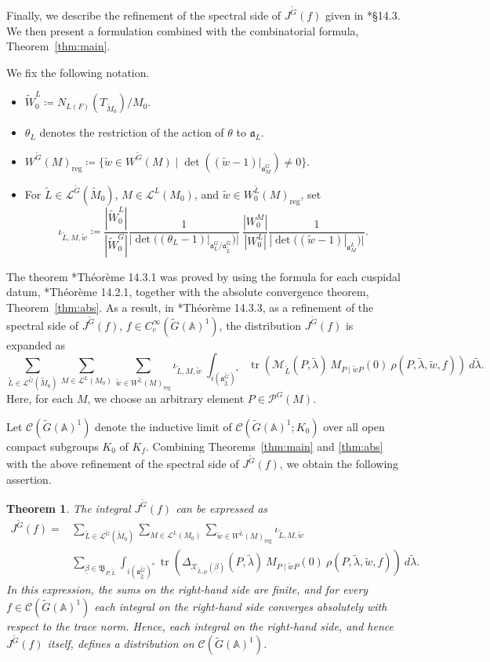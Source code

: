 \documentclass[12pt]{amsart}
\theoremstyle{definition}
\theoremstyle{plain}
\newtheorem{theorem}[definition]{Theorem}
\theoremstyle{remark}
\def\A{\mathbb{A}}%
\def\inf{\infty}
\DeclareMathOperator{\tr}{tr}%
\newcommand{\fa}{\mathfrak{a}}
\newcommand{\fB}{\mathfrak{B}}
\newcommand{\cC}{\mathcal{C}}
\newcommand{\cL}{\mathcal{L}}
\newcommand{\cM}{\mathcal{M}}
\newcommand{\cP}{\mathcal{P}}
\newcommand{\cX}{\mathcal{X}}
\newcommand{\reg}{\mathrm{reg}}
\numberwithin{equation}{section}
\newcommand{\tG}{\widetilde{G}}
\newcommand{\tM}{\widetilde{M}}
\newcommand{\tL}{\widetilde{L}}
\newcommand{\tW}{\widetilde{W}}
\newcommand{\tlambda}{\widetilde{\lambda}}
\newcommand{\tw}{\widetilde{w}}
\begin{document}
Finally, we describe the refinement of the spectral side of $J^{\tG}(f)$ given in \cite{LW13}*{\S14.3}.
We then present a formulation combined with the combinatorial formula, Theorem~\ref{thm:main}.

We fix the following notation.
\begin{itemize}
    \item $\tW^L_0\coloneqq N_{L(F)}(T_{\tM_0})/M_0$. 
    \item $\theta_L$ denotes the restriction of the action of $\theta$ to $\fa_L$.
    \item $W^{\tG}(M)_\reg\coloneqq\{ \tw\in W^{\tG}(M) \mid \det( (\tw-1)|_{\fa_M^G})\neq 0  \}$.
    \item For $\tL\in\cL^{\tG}(\tM_0)$, $M\in\cL^L(M_0)$, and $\tw\in W_0^{\tL}(M)_\reg$, set
    \[
    \iota_{\tL,M,\tw}\coloneqq \frac{|\tW^L_0|}{|\tW^G_0|}\frac{1}{|\det((\theta_L-1)|_{\fa_L^G/\fa_{\tL}^{\tG}})|} \   \frac{|W^M_0|}{|W^L_0|}\frac{1}{|\det((\tw-1)|_{\fa_M^L})|}.
    \]
\end{itemize}
The theorem \cite{LW13}*{Th\'eor\`eme 14.3.1} was proved by using the formula for each cuspidal datum, \cite{LW13}*{Th\'eor\`eme 14.2.1}, together with the absolute convergence theorem, Theorem~\ref{thm:abs}.
As a result, in \cite{LW13}*{Th\'eor\`eme 14.3.3}, as a refinement of the spectral side of $J^{\tG}(f)$, $f\in C_c^\inf(\tG(\A)^1)$, the distribution $J^{\tG} (f)$ is expanded as
\[
\sum_{\tL\in\cL^{\tG}(\tM_0)} \sum_{M\in\cL^L(M_0)} \sum_{\tw\in W^{\tL}(M)_\reg}\iota_{\tL,M,\tw} \ \int_{i(\fa_{\tL}^{\tG})^*} \tr\left( \cM_{\tL}(P,\tlambda) \ M_{P\mid\tw P}(0)\ \rho(P,\tlambda,\tw,f) \right) \ d\tlambda.
\]
Here, for each $M$, we choose an arbitrary element $P\in\cP^G(M)$.

Let $\cC(\tG(\A)^1)$ denote the inductive limit of $\cC(\tG(\A)^1;K_0)$ over all open compact subgroups $K_0$ of $K_f$.
Combining Theorems~\ref{thm:main} and \ref{thm:abs} with the above refinement of the spectral side of $J^{\tG}(f)$, we obtain the following assertion.
\begin{theorem}\label{thm:conti}
The integral $J^{\tG}(f)$ can be expressed as
\begin{align*}
 J^{\tG}(f)=&\sum_{\tL\in\cL^{\tG}(\tM_0)} \sum_{M\in\cL^L(M_0)} \sum_{\tw\in W^{\tL}(M)_\reg}\iota_{\tL,M,\tw} \\ 
& \sum_{\underline{\beta}\in \fB_{P,\tL}}
\int_{i(\fa_{\tL}^{\tG})^*} \tr\left( \Delta_{\cX_{\tL,\underline{\mu}}(\underline{\beta})}(P,\tlambda) \ M_{P\mid\tw P}(0)\ \rho(P,\tlambda,\tw,f) \right) \ d\tlambda .
\end{align*}
In this expression, the sums on the right-hand side are finite, and for every $f\in\cC(\tG(\A)^1)$ each integral on the right-hand side converges absolutely with respect to the trace norm.
Hence, each integral on the right-hand side, and hence $J^{\tG}(f)$ itself, defines a distribution on $\cC(\tG(\A)^1)$.
\end{theorem}






 
\end{document}
